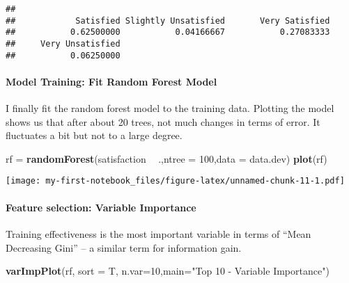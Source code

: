 \documentclass[
]{article}
\newenvironment{Shaded}{\begin{snugshade}}{\end{snugshade}}
\newcommand{\CommentTok}[1]{\textcolor[rgb]{0.56,0.35,0.01}{\textit{#1}}}
\newcommand{\DataTypeTok}[1]{\textcolor[rgb]{0.13,0.29,0.53}{#1}}
\newcommand{\DecValTok}[1]{\textcolor[rgb]{0.00,0.00,0.81}{#1}}
\newcommand{\KeywordTok}[1]{\textcolor[rgb]{0.13,0.29,0.53}{\textbf{#1}}}
\newcommand{\NormalTok}[1]{#1}
\newcommand{\OperatorTok}[1]{\textcolor[rgb]{0.81,0.36,0.00}{\textbf{#1}}}
\newcommand{\StringTok}[1]{\textcolor[rgb]{0.31,0.60,0.02}{#1}}
\begin{document}
\begin{Shaded}
\end{Shaded}

\begin{verbatim}
## 
##            Satisfied Slightly Unsatisfied       Very Satisfied 
##           0.62500000           0.04166667           0.27083333 
##     Very Unsatisfied 
##           0.06250000
\end{verbatim}

\hypertarget{model-training-fit-random-forest-model}{%
\paragraph{Model Training: Fit Random Forest
Model}\label{model-training-fit-random-forest-model}}

I finally fit the random forest model to the training data. Plotting the
model shows us that after about 20 trees, not much changes in terms of
error. It fluctuates a bit but not to a large degree.

\begin{Shaded}
\begin{Highlighting}[]
\NormalTok{rf =}\StringTok{ }\KeywordTok{randomForest}\NormalTok{(satisfaction }\OperatorTok{~}\StringTok{ }\NormalTok{.,}\DataTypeTok{ntree =} \DecValTok{100}\NormalTok{,}\DataTypeTok{data =}\NormalTok{ data.dev)}
\KeywordTok{plot}\NormalTok{(rf)}
\end{Highlighting}
\end{Shaded}

\texttt{[image: my-first-notebook\_files/figure-latex/unnamed-chunk-11-1.pdf]}

\hypertarget{feature-selection-variable-importance}{%
\paragraph{Feature selection: Variable
Importance}\label{feature-selection-variable-importance}}

Training effectiveness is the most important variable in terms of ``Mean
Decreasing Gini'' -- a similar term for information gain.

\begin{Shaded}
\begin{Highlighting}[]
\KeywordTok{varImpPlot}\NormalTok{(rf, }\DataTypeTok{sort =}\NormalTok{ T, }\DataTypeTok{n.var=}\DecValTok{10}\NormalTok{,}\DataTypeTok{main=}\StringTok{"Top 10 - Variable Importance"}\NormalTok{)}
\end{Highlighting}
\end{Shaded}
\end{document}
